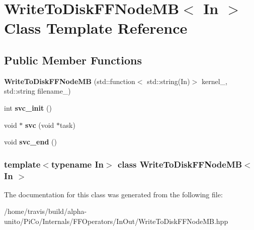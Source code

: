 \hypertarget{class_write_to_disk_f_f_node_m_b}{\section{\-Write\-To\-Disk\-F\-F\-Node\-M\-B$<$ \-In $>$ \-Class \-Template \-Reference}
\label{class_write_to_disk_f_f_node_m_b}
}
\subsection*{\-Public \-Member \-Functions}
\begin{DoxyCompactItemize}
\item 
\hypertarget{class_write_to_disk_f_f_node_m_b_adbcf5f0002beb3b02253d5655593171d}{{\bfseries \-Write\-To\-Disk\-F\-F\-Node\-M\-B} (std\-::function$<$ std\-::string(\-In)$>$ kernel\-\_\-, std\-::string filename\-\_\-)}\label{class_write_to_disk_f_f_node_m_b_adbcf5f0002beb3b02253d5655593171d}

\item 
\hypertarget{class_write_to_disk_f_f_node_m_b_a4e478fa43f2cfaeca8cd8d083e86530a}{int {\bfseries svc\-\_\-init} ()}\label{class_write_to_disk_f_f_node_m_b_a4e478fa43f2cfaeca8cd8d083e86530a}

\item 
\hypertarget{class_write_to_disk_f_f_node_m_b_abce2906ec0667b0d938112bb58400e5b}{void $\ast$ {\bfseries svc} (void $\ast$task)}\label{class_write_to_disk_f_f_node_m_b_abce2906ec0667b0d938112bb58400e5b}

\item 
\hypertarget{class_write_to_disk_f_f_node_m_b_a163eab49dbd21de69ae5400973e7ce36}{void {\bfseries svc\-\_\-end} ()}\label{class_write_to_disk_f_f_node_m_b_a163eab49dbd21de69ae5400973e7ce36}

\end{DoxyCompactItemize}
\subsubsection*{template$<$typename \-In$>$ class Write\-To\-Disk\-F\-F\-Node\-M\-B$<$ In $>$}



\-The documentation for this class was generated from the following file\-:\begin{DoxyCompactItemize}
\item 
/home/travis/build/alpha-\/unito/\-Pi\-Co/\-Internals/\-F\-F\-Operators/\-In\-Out/\-Write\-To\-Disk\-F\-F\-Node\-M\-B.\-hpp\end{DoxyCompactItemize}
